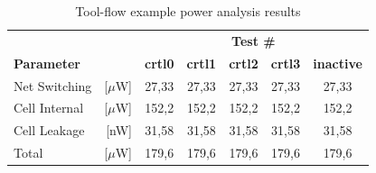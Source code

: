 \begin{table}[hbpt]
    \centering
    \begin{tabular}{lrccccc}
         & & \multicolumn{5}{c}{\textbf{Test \#}} \\
        \cline{3-7}
        \textbf{Parameter} &  & \textbf{crtl0} & \textbf{crtl1} & \textbf{crtl2} & \textbf{crtl3} & \textbf{inactive} \\
        \toprule
        Net Switching & [$\mu$W] & 27,33 & 27,33 & 27,33 & 27,33 & 27,33 \\
        Cell Internal & [$\mu$W] & 152,2 & 152,2 & 152,2 & 152,2 & 152,2 \\
        Cell Leakage & [nW] & 31,58 & 31,58 & 31,58 & 31,58 & 31,58 \\
        Total & [$\mu$W] & 179,6  & 179,6 & 179,6 & 179,6 & 179,6 \\
        \bottomrule
    \end{tabular}
    \caption{Tool-flow example power analysis results}
    \label{tab:powestreportex}
\end{table}